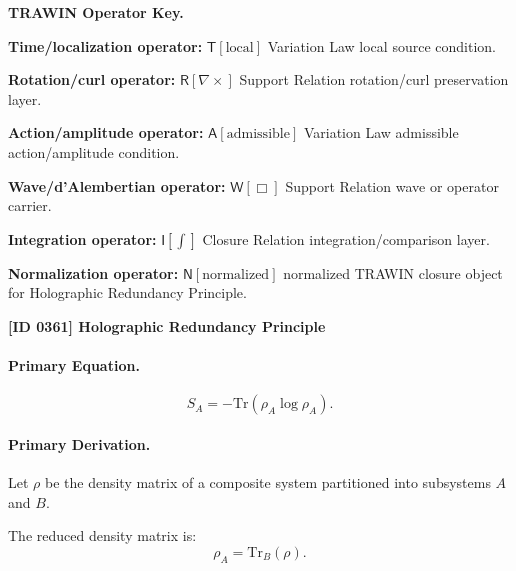 \par\vspace{0.45\baselineskip}
\noindent\begin{minipage}[t]{\linewidth}
\begingroup
\small
\raggedright
\textbf{TRAWIN Operator Key.}\par
\noindent\textbf{Time/localization operator:} $\mathsf{T}\!\left[\mathrm{local}\right]$ Variation Law local source condition.\par
\noindent\textbf{Rotation/curl operator:} $\mathsf{R}\!\left[\nabla\times\right]$ Support Relation rotation/curl preservation layer.\par
\noindent\textbf{Action/amplitude operator:} $\mathsf{A}\!\left[\mathrm{admissible}\right]$ Variation Law admissible action/amplitude condition.\par
\noindent\textbf{Wave/d'Alembertian operator:} $\mathsf{W}\!\left[\Box\right]$ Support Relation wave or operator carrier.\par
\noindent\textbf{Integration operator:} $\mathsf{I}\!\left[\int\right]$ Closure Relation integration/comparison layer.\par
\noindent\textbf{Normalization operator:} $\mathsf{N}\!\left[\mathrm{normalized}\right]$ normalized TRAWIN closure object for Holographic Redundancy Principle.\par
\endgroup
\end{minipage}

\clearpage
\noindent\textbf{[ID 0361] Holographic Redundancy Principle}\par
\vspace{0.35em}
\paragraph{Primary Equation.}
\begin{equation}
S_A = -\mathrm{Tr}(\rho_A \log \rho_A).
\end{equation}

\paragraph{Primary Derivation.}
Let $\rho$ be the density matrix of a composite system partitioned into subsystems $A$ and $B$.

The reduced density matrix is:
\begin{equation}
\rho_A = \mathrm{Tr}_B(\rho).
\end{equation}

